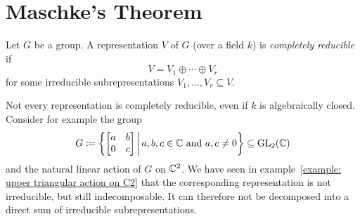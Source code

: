 \section{Maschke’s Theorem}


\begin{definition}
  Let $G$ be a group.
  A representation $V$ of $G$ (over a field $k$) is \emph{completely reducible} if
  \[
      V
    = V_1 \oplus \dotsb \oplus V_r
  \]
  for some irreducible subrepresentations $V_1, \dotsc, V_r \subseteq V$.
\end{definition}


\begin{remark}
  Not every representation is completely reducible, even if $k$ is algebraically closed.
  Consider for example the group
  \[
    G
    \defined \left\{
                \begin{bmatrix}
                  a & b \\
                  0 & c
                \end{bmatrix}
              \suchthat*
                \text{$a, b, c \in \Complex$ and $a,c \neq 0$}
              \right\}
    \subseteq \GL_2(\Complex)
  \]
  and the natural linear action of $G$ on $\mathbb{C}^2$.
  We have seen in example~\ref{example: upper triangular action on C2} that the corresponding representation is not irreducible, but still indecomposable.
  It can therefore not be decomposed into a direct sum of irreducible subrepresentations.
\end{remark}




